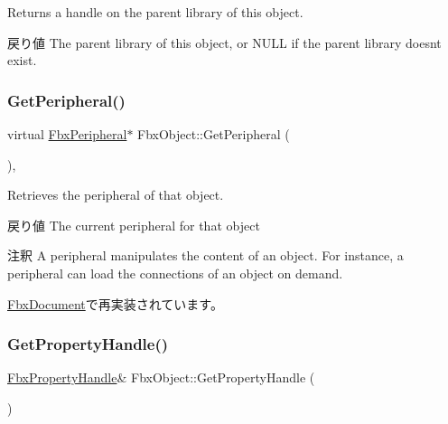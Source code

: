 Returns a handle on the parent library of this object. \begin{DoxyReturn}{戻り値}
The parent library of this object, or {\ttfamily N\+U\+LL} if the parent library doesn\textquotesingle{}t exist. 
\end{DoxyReturn}
\mbox{\label{class_fbx_object_a7aef9083f559702547871bedbf0d6b5a}} 
\subsubsection{\texorpdfstring{Get\+Peripheral()}{GetPeripheral()}}
{\footnotesize\ttfamily virtual \hyperlink{class_fbx_peripheral}{Fbx\+Peripheral}$\ast$ Fbx\+Object\+::\+Get\+Peripheral (\begin{DoxyParamCaption}{ }\end{DoxyParamCaption})\hspace{0.3cm}{\ttfamily [protected]}, {\ttfamily [virtual]}}

Retrieves the peripheral of that object. \begin{DoxyReturn}{戻り値}
The current peripheral for that object 
\end{DoxyReturn}
\begin{DoxyRemark}{注釈}
A peripheral manipulates the content of an object. For instance, a peripheral can load the connections of an object on demand. 
\end{DoxyRemark}


\hyperlink{class_fbx_document_a83abd11e3c318ab4f20a23282626bb7d}{Fbx\+Document}で再実装されています。

\mbox{\label{class_fbx_object_a779778f1761213ed413fa55c0b540d8e}} 
\subsubsection{\texorpdfstring{Get\+Property\+Handle()}{GetPropertyHandle()}}
{\footnotesize\ttfamily \hyperlink{class_fbx_property_handle}{Fbx\+Property\+Handle}\& Fbx\+Object\+::\+Get\+Property\+Handle (\begin{DoxyParamCaption}{ }\end{DoxyParamCaption})\hspace{0.3cm}{\ttfamily [inline]}}



